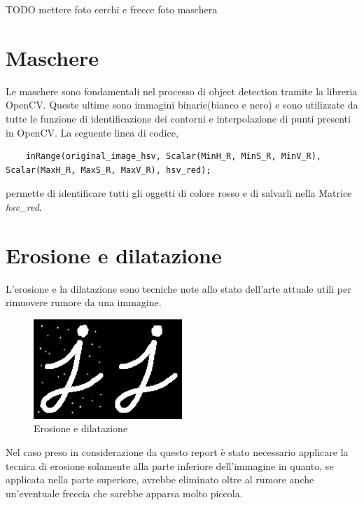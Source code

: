 TODO mettere foto cerchi e frecce
foto maschera

\section{Maschere}
Le maschere sono fondamentali nel processo di object detection tramite la libreria OpenCV.
Queste ultime sono immagini binarie(bianco e nero) e sono utilizzate da tutte le funzione di identificazione dei contorni e interpolazione di punti presenti in OpenCV.
La seguente linea di codice,

\begin{lstlisting}
	inRange(original_image_hsv, Scalar(MinH_R, MinS_R, MinV_R), Scalar(MaxH_R, MaxS_R, MaxV_R), hsv_red);
\end{lstlisting}

permette di identificare tutti gli oggetti di colore rosso e di salvarli nella Matrice \textit{hsv\_red}.
\section{Erosione e dilatazione}
L'erosione e la dilatazione sono tecniche note allo stato dell'arte attuale utili per rimuovere rumore da una immagine.

\begin{figure}[H]
	\centering
	\includegraphics[width=0.5\textwidth]{Immagini/erosion_dil.png}
	\caption{Erosione e dilatazione}
	\label{fig:erosion_dil}
\end{figure}

Nel caso preso in considerazione da questo report è stato necessario applicare la tecnica di erosione solamente alla parte inferiore dell'immagine in quanto, se applicata nella parte superiore, avrebbe eliminato oltre al rumore anche un'eventuale freccia che sarebbe apparsa molto piccola.